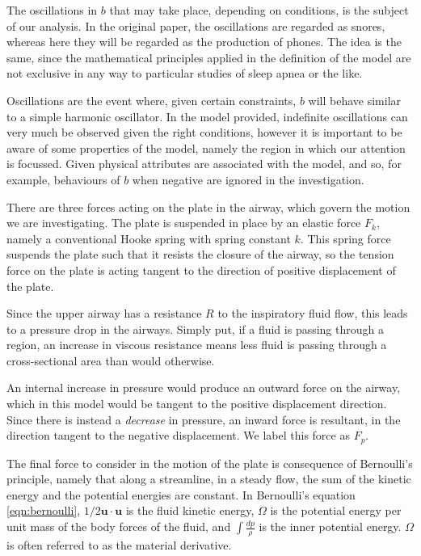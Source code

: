 \documentclass{article}
\begin{document}

The oscillations in $b$ that may take place, depending on conditions, is the subject of our analysis.
In the original paper, the oscillations are regarded as snores,
whereas here they will be regarded as the production of phones.
The idea is the same, since the mathematical principles applied in the definition of the model are not exclusive in any way to particular studies of sleep apnea or the like.

Oscillations are the event where, given certain constraints, $b$ will behave similar to a simple harmonic oscillator.
In the model provided, indefinite oscillations can very much be observed given the right conditions,
however it is important to be aware of some properties of the model,
namely the region in which our attention is focussed. Given physical attributes are associated with the model,
and so, for example, behaviours of $b$ when negative are ignored in the investigation.

There are three forces acting on the plate in the airway, which govern the motion we are investigating.
The plate is suspended in place by an elastic force $F_k$, namely a conventional Hooke spring with spring constant $k$.
This spring force suspends the plate such that it resists the closure of the airway,
so the tension force on the plate is acting tangent to the direction of positive displacement of the plate.


Since the upper airway has a resistance $R$ to the inspiratory fluid flow,
this leads to a pressure drop in the airways.
Simply put, if a fluid is passing through a region,
an increase in viscous resistance means less fluid is passing through a cross-sectional area than would otherwise.

An internal increase in pressure would produce an outward force on the airway,
which in this model would be tangent to the positive displacement direction.
Since there is instead a \textit{decrease} in pressure, an inward force is resultant,
in the direction tangent to the negative displacement. We label this force as $F_p$.

The final force to consider in the motion of the plate is consequence of Bernoulli's principle,
namely that along a streamline, in a steady flow, 
the sum of the kinetic energy and the potential energies are constant.
In Bernoulli's equation \ref{eqn:bernoulli}, $1/2\mathbf{u}\cdot\mathbf{u}$ is the fluid kinetic energy,
$\Omega$ is the potential energy per unit mass of the body forces of the fluid,
and $\int\frac{dp}{\rho}$ is the inner potential energy.
$\Omega$ is often referred to as the material derivative.
\end{document}
